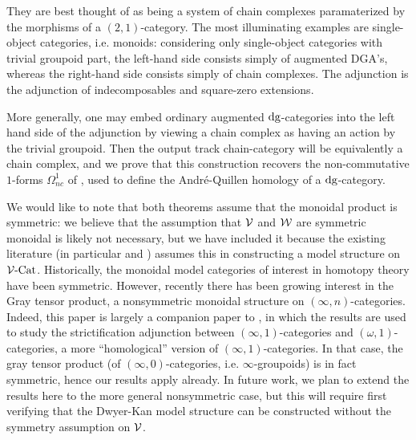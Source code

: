 \documentclass[12pt]{amsart}
\begin{document}
They are best thought of as being a system of chain complexes paramaterized by the morphisms of a $(2,1)$-category. 
The most illuminating examples are single-object categories, i.e. monoids: considering only single-object categories with trivial groupoid part,
the left-hand side consists simply of augmented DGA's, whereas the right-hand side consists simply of chain complexes. The adjunction is the adjunction of indecomposables and square-zero extensions.
\par 
More generally, one may embed ordinary augmented $\mathrm{dg}$-categories into the left hand side of the adjunction by viewing a chain complex as having an action by the trivial groupoid. 
Then the output track chain-category will be equivalently a chain complex, and we prove that this construction recovers the non-commutative $1$-forms $\Omega^1_{nc}$ of \cite{Tabuada2009}, used to define the Andr{\'e}-Quillen homology of a $\mathrm{dg}$-category.
\par We would like to note that both theorems assume that the monoidal product is symmetric:
we believe that the assumption that $\mathcal{V}$ and $\mathcal{W}$ are symmetric monoidal is likely not necessary, but we have included it because the existing literature (in particular \cite{Muro2012} and \cite{BergerMoerdijk2012}) assumes this in constructing a model structure on $\mathcal{V}\text{-}\mathrm{Cat}$. 
Historically, the monoidal model categories of interest in homotopy theory have been symmetric. 
However, recently there has been growing interest in the Gray tensor product, a nonsymmetric monoidal structure on $(\infty,n)$-categories.
Indeed, this paper is largely a companion paper to \cite{Strong2025}, in which the results are used to study the strictification adjunction between $(\infty,1)$-categories and $(\omega,1)$-categories, a more ``homological'' version of $(\infty,1)$-categories.
In that case, the gray tensor product (of $(\infty,0)$-categories, i.e. $\infty$-groupoids) is in fact symmetric, hence our results apply already.
In future work, we plan to extend the results here to the more general nonsymmetric case, but this will require first verifying that the Dwyer-Kan model structure can be constructed without the symmetry assumption on $\mathcal{V}$.
\end{document}
